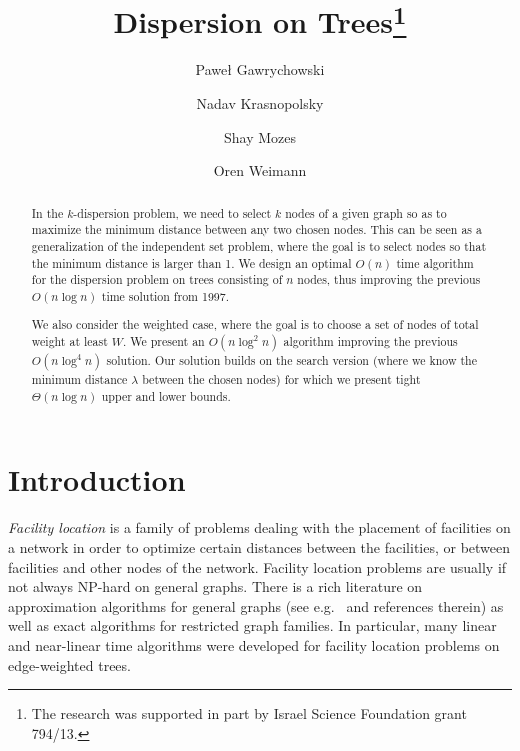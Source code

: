 \documentclass[a4paper,UKenglish]{lipics-v2016}
\title{Dispersion on Trees\protect \thanks{The research was supported in part by Israel Science Foundation grant 794/13.}}
\author[1]{Pawe\l{} Gawrychowski}
\author[1]{Nadav Krasnopolsky}
\author[2]{Shay Mozes}
\author[1]{Oren Weimann}
\affil[1]{University of Haifa, Israel}
\affil[2]{IDC Herzliya, Israel}
\theoremstyle{plain}
\newcommand{\Oh}{{O}}
\begin{document}
\maketitle

\begin{abstract}
In the $k$-dispersion problem, we need to select $k$ nodes of a given graph so as to maximize
the minimum distance between any two chosen nodes. This can be seen as a generalization
of the independent set problem, where the goal is to select nodes so that the minimum distance
is larger than 1.
We design an optimal $\Oh(n)$ time algorithm for the dispersion problem on trees consisting
of $n$ nodes, thus improving the previous  $\Oh(n\log n)$ time solution from 1997. 

We also consider the weighted case, where the goal is to choose a set of nodes of total weight at least $W$. We present an $\Oh(n\log^2n)$ algorithm improving the previous $\Oh(n\log^4 n)$ solution. Our solution builds on the search version (where we know the minimum distance $\lambda$ between the chosen nodes) for which we present tight $\Theta(n\log n)$ upper and lower bounds. 
\end{abstract}

\section{Introduction}

\emph{Facility location} is a family of problems dealing with the placement of facilities on a network in order to optimize certain distances between the facilities, or between facilities and other nodes of the network. Facility location problems are usually if not always NP-hard on general graphs. There is a rich literature on approximation algorithms for general graphs (see e.g.~\cite{DavidB.Shmoys1997,Vazirani2003} and references therein) as well as exact algorithms for restricted graph families. In particular, many linear and near-linear time algorithms were developed for facility location problems on edge-weighted trees.   
\end{document}
